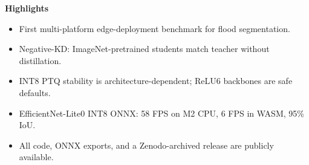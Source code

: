 \documentclass[11pt]{article}
\begin{document}
\begin{center}\Large\textbf{Highlights}\end{center}

\begin{itemize}
\item First multi-platform edge-deployment benchmark for flood segmentation.
\item Negative-KD: ImageNet-pretrained students match teacher without distillation.
\item INT8 PTQ stability is architecture-dependent; ReLU6 backbones are safe defaults.
\item EfficientNet-Lite0 INT8 ONNX: 58 FPS on M2 CPU, 6 FPS in WASM, 95\% IoU.
\item All code, ONNX exports, and a Zenodo-archived release are publicly available.
\end{itemize}
\end{document}
